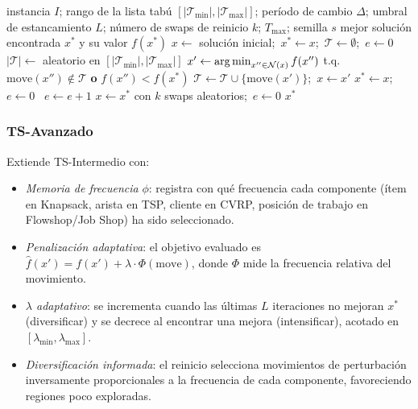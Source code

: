 \begin{algorithm}[t]
\caption{TS-Intermedio}\label{alg:ts_intermedio}
\begin{algorithmic}[1]
  \Require instancia $I$; rango de la lista tabú
           $[|\mathcal{T}_{\min}|, |\mathcal{T}_{\max}|]$; período de
           cambio $\Delta$; umbral de estancamiento $L$; número de swaps
           de reinicio $k$; $T_{\max}$; semilla $s$
  \Ensure mejor solución encontrada $x^*$ y su valor $f(x^*)$
  \State $x \leftarrow$ solución inicial;\ $x^* \leftarrow x$;\
         $\mathcal{T} \leftarrow \emptyset$;\ $e \leftarrow 0$
      \State $|\mathcal{T}| \leftarrow$ aleatorio en
             $[|\mathcal{T}_{\min}|, |\mathcal{T}_{\max}|]$
    \EndIf
    \State $x' \leftarrow \operatorname*{arg\,min}_{x'' \in \mathcal{N}(x)} f(x'')$
           t.q.\ $\text{move}(x'') \notin \mathcal{T}$
           \textbf{o} $f(x'') < f(x^*)$ 
    \State $\mathcal{T} \leftarrow \mathcal{T} \cup \{\text{move}(x')\}$;\
           $x \leftarrow x'$
    \If{$f(x) < f(x^*)$} $x^* \leftarrow x$;\ $e \leftarrow 0$
    \Else\ $e \leftarrow e + 1$ \EndIf
    \If{$e \geq L$} \Comment{reinicio suave}
      \State $x \leftarrow x^*$ con $k$ swaps aleatorios;\ $e \leftarrow 0$
    \EndIf
  \EndFor
  \State \Return $x^*$
\end{algorithmic}
\end{algorithm}

\subsubsection{TS-Avanzado}
Extiende TS-Intermedio con:
\begin{itemize}
  \item \emph{Memoria de frecuencia} $\phi$: registra con qué frecuencia
    cada componente (ítem en Knapsack, arista en TSP, cliente en CVRP,
    posición de trabajo en Flowshop/Job Shop) ha sido seleccionado.
  \item \emph{Penalización adaptativa}: el objetivo evaluado es
    $\hat{f}(x') = f(x') + \lambda \cdot \Phi(\text{move})$, donde
    $\Phi$ mide la frecuencia relativa del movimiento.
  \item \emph{$\lambda$ adaptativo}: se incrementa cuando las últimas
    $L$ iteraciones no mejoran $x^*$ (diversificar) y se decrece al
    encontrar una mejora (intensificar), acotado en
    $[\lambda_{\min}, \lambda_{\max}]$.
  \item \emph{Diversificación informada}: el reinicio selecciona
    movimientos de perturbación inversamente proporcionales a la
    frecuencia de cada componente, favoreciendo regiones poco exploradas.
\end{itemize}

